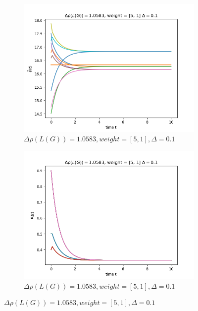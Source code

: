 \documentclass{article}
\begin{document}
\begin{problem}
\begin{figure}[!h]
        \begin{subfigure}{0.4\textwidth}
            \includegraphics[width=\textwidth]{./img/Figure_8.png}
            \caption{$\Delta \rho (L(G)) = 1.0583, weight = [5,1], \Delta = 0.1$}
        \end{subfigure}
        \begin{subfigure}{0.4\textwidth}
            \includegraphics[width=\textwidth]{./img/Figure_9.png}
            \caption{$\Delta \rho (L(G)) = 1.0583, weight = [5,1], \Delta = 0.1$}
        \end{subfigure}
    \end{figure}
    \newpage
    \begin{figure}[!h]
        \centering

\end{figure}
\end{problem}
\end{document}
